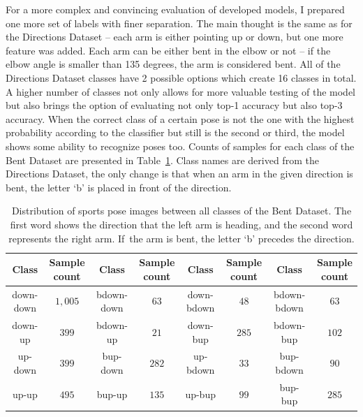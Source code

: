 For a more complex and convincing evaluation of developed models, I prepared one more set of labels with finer separation. The main thought is the same as for the Directions Dataset -- each arm is either pointing up or down, but one more feature was added. Each arm can be either bent in the elbow or not -- if the elbow angle is smaller than 135 degrees, the arm is considered bent. All of the Directions Dataset classes have 2 possible options which create 16 classes in total. A higher number of classes not only allows for more valuable testing of the model but also brings the option of evaluating not only top-1 accuracy but also top-3 accuracy. When the correct class of a certain pose is not the one with the highest probability according to the classifier but still is the second or third, the model shows some ability to recognize poses too. Counts of samples for each class of the Bent Dataset are presented in Table~\ref{tab:bent-dataset-counts}. Class names are derived from the Directions Dataset, the only change is that when an arm in the given direction is bent, the letter `b' is placed in front of the direction.

\begin{table}[!ht]
    \footnotesize
    \begin{center}
        \begin{tabular}{ |c|c||c|c||c|c||c|c| }
            \hline
                Class & \makecell{Sample \\ count} & Class & \makecell{Sample \\ count} & Class & \makecell{Sample \\ count} & Class & \makecell{Sample \\ count} \\
            \hline
            \hline
            down-down & $1{,}005$ & bdown-down & $63$ & down-bdown & $48$ & bdown-bdown & $63$ \\
            \hline
            down-up & $399$ & bdown-up & $21$ & down-bup & $285$ & bdown-bup & $102$ \\
            \hline
            up-down & $399$ & bup-down & $282$ & up-bdown & $33$ & bup-bdown & $90$ \\
            \hline
            up-up & $495$ & bup-up & $135$ & up-bup & $99$ & bup-bup & $285$ \\
            \hline
        \end{tabular}
    \end{center}
    \caption{Distribution of sports pose images between all classes of the Bent Dataset. The first word shows the direction that the left arm is heading, and the second word represents the right arm. If~the arm is bent, the letter `b' precedes the direction.}
    \label{tab:bent-dataset-counts}
\end{table}

